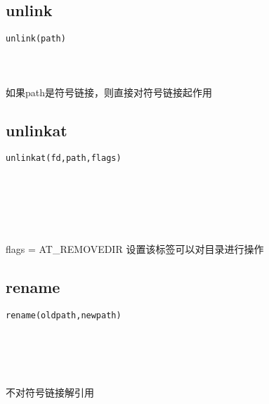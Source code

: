 \documentclass[10pt,a4paper]{article}
\begin{document}
\subsection{unlink}
\begin{spacing}{2.0}
\lstset{language=C,numbers=none}
\begin{lstlisting}
unlink(path)
\end{lstlisting}
{\large\color[rgb]{0.2,0.4,0.6}{path:}}
\paragraph{ \ \ }如果path是符号链接，则直接对符号链接起作用
\end{spacing}

\subsection{unlinkat}
\begin{spacing}{2.0}
\lstset{language=C,numbers=none}
\begin{lstlisting}
unlinkat(fd,path,flags)
\end{lstlisting}
{\large\color[rgb]{0.2,0.4,0.6}{fd:}} \\
{\large\color[rgb]{0.2,0.4,0.6}{path:}} \\
{\large\color[rgb]{0.2,0.4,0.6}{flags:}}
\paragraph{ \ \ }flags = AT\_REMOVEDIR 设置该标签可以对目录进行操作
\end{spacing}

\subsection{rename}
\begin{spacing}{2.0}
\lstset{language=C,numbers=none}
\begin{lstlisting}
rename(oldpath,newpath)
\end{lstlisting}
{\large\color[rgb]{0.2,0.4,0.6}{oldpath:}} \\
{\large\color[rgb]{0.2,0.4,0.6}{newpath:}}
\paragraph{ \ \ }不对符号链接解引用
\end{spacing}
\end{document}
